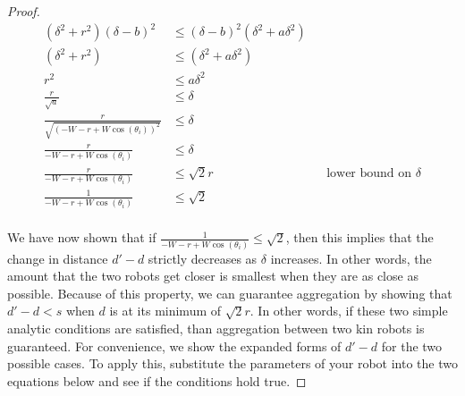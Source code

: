 \documentclass[conference]{IEEEtran}
\begin{document}
\begin{proof}
{\begin{align*}
        (\delta^2 + r^2)(\delta-b)^2 &\leq (\delta-b)^2(\delta^2 + a\delta^2) \\
        (\delta^2 + r^2) &\leq (\delta^2 + a\delta^2) \\
        r^2 &\leq a\delta^2 \\
        \frac{r}{\sqrt{a}} &\leq \delta \\
        \frac{r}{\sqrt{(-W-r+W\cos(\theta_i))^2}} &\leq \delta \\
        \frac{r}{-W-r+W\cos(\theta_i)} &\leq \delta \\
        \frac{r}{-W-r+W\cos(\theta_i)} &\leq \sqrt{2}r && \text{lower bound on }\delta \\
        \frac{1}{-W-r+W\cos(\theta_i)} &\leq \sqrt{2} \\
      \end{align*}

      We have now shown that if $\frac{1}{-W-r+W\cos(\theta_i)} \leq \sqrt{2}$, then this implies that the change in distance $d'-d$ strictly decreases as $\delta$ increases. In other words, the amount that the two robots get closer is smallest when they are as close as possible. Because of this property, we can guarantee aggregation by showing that $d'-d<s$ when $d$ is at its minimum of $\sqrt{2}r$. In other words, if these two simple analytic conditions are satisfied, than aggregation between two kin robots is guaranteed. For convenience, we show the expanded forms of $d'-d$ for the two possible cases. To apply this, substitute the parameters of your robot into the two equations below and see if the conditions hold true.

    }

  \end{proof}
\end{document}
